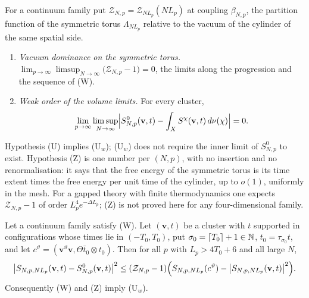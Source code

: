 \begin{definition}\label{def:Zw}
For a continuum family put $\mathcal Z_{N,p}=\mathcal Z_{NL_p}(NL_p)$ at coupling
$\beta_{N,p}$, the partition function of the symmetric torus
$\Lambda_{NL_p}$ relative to the vacuum of the cylinder of the same spatial
side.
\begin{enumerate}[leftmargin=*]
\item[\textup{(Z)}] \emph{Vacuum dominance on the symmetric torus.}
$\displaystyle\lim_{p\to\infty}\limsup_{N\to\infty}\bigl(\mathcal Z_{N,p}-1\bigr)=0$,
the limits along the progression and the sequence of \textup{(W)}.
\item[\textup{(U$_w$)}] \emph{Weak order of the volume limits.} For every
cluster,
\[
\lim_{p\to\infty}\limsup_{N\to\infty}\Bigl|S^0_{N,p}(\mathbf v,t)
-\int_XS^\chi(\mathbf v,t)\,d\nu(\chi)\Bigr|=0 .
\]
\end{enumerate}
\end{definition}

Hypothesis (U) implies (U$_w$); (U$_w$) does not require the inner limit of
$S^0_{N,p}$ to exist. Hypothesis (Z) is one number per $(N,p)$, with no
insertion and no renormalisation: it says that the free energy of the
symmetric torus is its time extent times the free energy per unit time of
the cylinder, up to $o(1)$, uniformly in the mesh. For a gapped theory with
finite thermodynamics one expects $\mathcal Z_{N,p}-1$ of order
$L_p^4e^{-\Delta L_p}$; (Z) is not proved here for any four-dimensional
family.

\begin{proposition}
\label{prop:ZgivesU}
Let a continuum family satisfy \textup{(W)}. Let $(\mathbf v,t)$ be a cluster
with $t$ supported in configurations whose times lie in $(-T_0,T_0)$, put
$\sigma_0=\lceil T_0\rceil+1\in\mathbb{N}$, $t_0=\tau_{\sigma_0}t$, and let
$c^\vartheta=(\mathbf v^\vartheta\mathbf v,\Theta\bar t_0\otimes t_0)$.
Then for all $p$ with $L_p>4T_0+6$ and all large $N$,
\begin{equation}\label{eq:SminusS0}
\bigl|S_{N,p,NL_p}(\mathbf v,t)-S^0_{N,p}(\mathbf v,t)\bigr|^2\le
(\mathcal Z_{N,p}-1)\Bigl(S_{N,p,NL_p}(c^\vartheta)-\bigl|S_{N,p,NL_p}(\mathbf v,t)
\bigr|^2\Bigr).
\end{equation}
Consequently \textup{(W)} and \textup{(Z)} imply \textup{(U$_w$)}.
\end{proposition}

